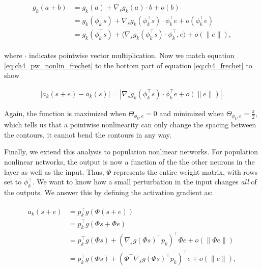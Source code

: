\begin{align}\label{eq:ch4_pw_nonlin_frechet}
\begin{split}
    g_{k}(a + b) &= g_{k}(a) + \nabla_{s}g_{k}(a) \cdot b + o(b) \\
    &=g_{k}(\phi_{k}^\top s) + \nabla_{s}g_{k}(\phi_{k}^\top s) \cdot \phi_{k}^\top e + o(\phi_{k}^\top e)\\
    &=g_{k}(\phi_{k}^\top s) + \langle\nabla_{s}g_{k}(\phi_{k}^\top s) \cdot \phi_{k}^\top, e\rangle + o(\|e\|),
\end{split}
\end{align}

where $\cdot$ indicates pointwise vector multiplication. Now we match equation \ref{eq:ch4_pw_nonlin_frechet} to the bottom part of equation \ref{eq:ch4_frechet} to show 

\begin{equation}
\begin{split}
    |a_{k}(s+e) - a_{k}(s)| = |\nabla_{s}g_{k}(\phi_{k}^\top s) \cdot \phi_{k}^\top e + o(\|e\|)|.
\end{split}
\end{equation}

Again, the function is maximized when $\Theta_{\phi_{k}, e}=0$ and minimized when $\Theta_{\phi_{k}, e}=\tfrac{\pi}{2}$, which tells us that a pointwise nonlinearity can only change the spacing between the contours, it cannot bend the contours in any way.

Finally, we extend this analysis to population nonlinear networks. For population nonlinear networks, the output is now a function of the the other neurons in the layer as well as the input. Thus, $\Phi$ represents the entire weight matrix, with rows set to $\phi_{k}^\top$. We want to know how a small perturbation in the input changes \emph{all} of the outputs. We answer this by defining the activation gradient as:

\begin{align}\label{eq:pop_nonlinear}
\begin{split}
   a_{k}(s+e) &= p_{k}^\top g(\Phi(s+e)) \\
   &= p_{k}^\top g(\Phi s + \Phi e) \\
   &= p_{k}^\top g(\Phi s) + (\nabla_{s}g(\Phi s)^\top p_{k})^\top \Phi e + o(\|\Phi e\|) \\
   &= p_{k}^\top g(\Phi s) + (\Phi^\top \nabla_{s}g(\Phi s)^\top p_{k})^\top e + o(\|e\|),
\end{split}
\end{align}


